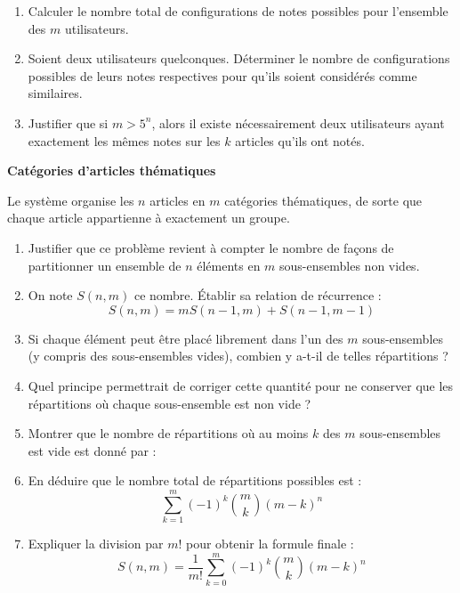 \documentclass[10pt,a4paper]{article}
\begin{document}
    \begin{enumerate}
        \item Calculer le nombre total de configurations de notes possibles pour l'ensemble des \( m \)
        utilisateurs.
        \item Soient deux utilisateurs quelconques. Déterminer le nombre de configurations possibles
        de leurs notes respectives pour qu'ils soient considérés comme similaires.
        \item  Justifier que si \( m > 5^n \), alors il existe nécessairement deux utilisateurs
        ayant exactement les mêmes notes sur les \( k \) articles qu'ils ont notés.
    \end{enumerate}


\q \textbf{Catégories d'articles thématiques}

    Le système organise les \( n \) articles en \( m \) catégories thématiques, de sorte que chaque
    article appartienne à exactement un groupe.

    \begin{enumerate}
        \item Justifier que ce problème revient à compter le nombre de façons de partitionner un
        ensemble de \( n \) éléments en \( m \) sous-ensembles non vides.
        \item On note \( S(n, m) \) ce nombre. Établir sa relation de récurrence :
        \[
        S(n, m) = m S(n-1, m) + S(n-1, m-1)
        \]
        \item Si chaque élément peut être placé librement dans l'un des \( m \) sous-ensembles (y
        compris des sous-ensembles vides), combien y a-t-il de telles répartitions ?
        \item Quel principe permettrait de corriger cette quantité pour ne conserver que les
        répartitions où chaque sous-ensemble est non vide ?
        \item Montrer que le nombre de répartitions où au moins $k$ des \( m \) sous-ensembles est
        vide est donné par :
        \item En déduire que le nombre total de répartitions possibles est :
        \[
        \sum_{k=1}^{m} (-1)^k \binom{m}{k} (m-k)^n
        \]
        \item Expliquer la division par \( m! \) pour obtenir la formule finale :
        \[
        S(n, m) = \frac{1}{m!} \sum_{k=0}^{m} (-1)^k \binom{m}{k} (m-k)^n
        \]


    \end{enumerate}
\end{document}

